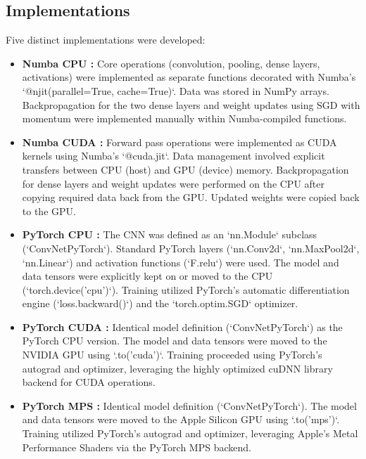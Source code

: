 \documentclass[conference]{IEEEtran} %
\begin{document}
\subsection{Implementations}
Five distinct implementations were developed:
\begin{itemize}
    \item \textbf{Numba CPU :} Core operations (convolution, pooling, dense layers, activations) were implemented as separate functions decorated with Numba's `@njit(parallel=True, cache=True)`. Data was stored in NumPy arrays. Backpropagation for the two dense layers and weight updates using SGD with momentum were implemented manually within Numba-compiled functions.
    \item \textbf{Numba CUDA :} Forward pass operations were implemented as CUDA kernels using Numba's `@cuda.jit`. Data management involved explicit transfers between CPU (host) and GPU (device) memory. Backpropagation for dense layers and weight updates were performed on the CPU after copying required data back from the GPU. Updated weights were copied back to the GPU.
    \item \textbf{PyTorch CPU :} The CNN was defined as an `nn.Module` subclass (`ConvNetPyTorch`). Standard PyTorch layers (`nn.Conv2d`, `nn.MaxPool2d`, `nn.Linear`) and activation functions (`F.relu`) were used. The model and data tensors were explicitly kept on or moved to the CPU (`torch.device('cpu')`). Training utilized PyTorch's automatic differentiation engine (`loss.backward()`) and the `torch.optim.SGD` optimizer.
    \item \textbf{PyTorch CUDA :} Identical model definition (`ConvNetPyTorch`) as the PyTorch CPU version. The model and data tensors were moved to the NVIDIA GPU using `.to('cuda')`. Training proceeded using PyTorch's autograd and optimizer, leveraging the highly optimized cuDNN library backend for CUDA operations.
    \item \textbf{PyTorch MPS :} Identical model definition (`ConvNetPyTorch`). The model and data tensors were moved to the Apple Silicon GPU using `.to('mps')`. Training utilized PyTorch's autograd and optimizer, leveraging Apple's Metal Performance Shaders via the PyTorch MPS backend.
\end{itemize}
\end{document}
